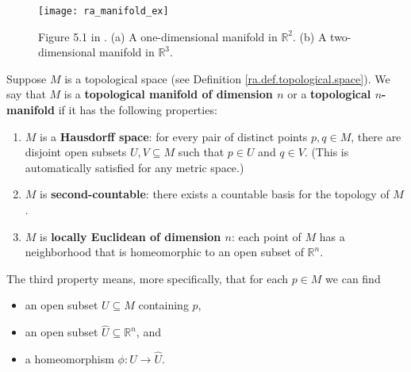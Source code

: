 \begin{figure}[htbp]
\begin{center}
\texttt{[image: ra\_manifold\_ex]}
\caption{Figure 5.1 in \citet{spivak1971calculus}. (a) A one-dimensional manifold in \(\mathbb{R}^2\). (b) A two-dimensional manifold in \(\mathbb{R}^3\).}
\label{ra_manifold_ex_fig}
\end{center}
\end{figure}

\begin{definition}\label{ra.lee.def.topological manifold}

Suppose \(M\) is a topological space (see Definition \ref{ra.def.topological.space}). We say that \(M\) is a \textbf{topological manifold of dimension \(n\)} or a \textbf{topological \(n\)-manifold} if it has the following properties:

\begin{enumerate}

\item \(M\) is a \textbf{Hausdorff space}: for every pair of distinct points \(p, q \in M\), there are disjoint open subsets \(U, V \subseteq M\) such that \(p \in U\) and \(q \in V\). (This is automatically satisfied for any metric space.)

\item \(M\) is \textbf{second-countable}: there exists a countable basis for the topology of \(M\).

\item \(M\) is \textbf{locally Euclidean of dimension \(n\)}: each point of \(M\) has a neighborhood that is homeomorphic to an open subset of \(\mathbb{R}^n\).

\end{enumerate}

The third property means, more specifically, that for each \(p \in M\) we can find

\begin{itemize}

\item an open subset \(U \subseteq M\) containing \(p\),

\item an open subset \(\hat{U} \subseteq \mathbb{R}^n\), and

\item a homeomorphism \(\phi: U \to \hat{U}\).

\end{itemize}


\end{definition}

